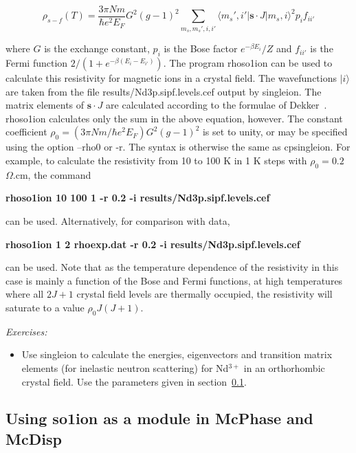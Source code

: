 \begin{enumerate}
\begin{equation} \label{eq:cfres}
\rho_{s-f}(T) = \frac{3\pi N m}{\hbar e^2 E_F} G^2(g-1)^2 \sum_{m_s,m_s',i,i'} 
      \langle m_s',i' | {\mathbf s \cdot J} | m_s, i \rangle^2 p_i f_{ii'}
\end{equation}

\noindent where $G$ is the exchange constant, $p_i$ is the Bose factor $e^{-\beta E_i}/Z$ and $f_{ii'}$ is the
Fermi function $2/(1+e^{-\beta(E_i-E_{i'})})$. The program {\prg rhoso1ion} can be used to calculate this
resistivity for magnetic ions in a crystal field. The wavefunctions $|i\rangle$ are taken from the file {\prg
results/Nd3p.sipf.levels.cef} output by {\prg singleion}. The matrix elements of ${\mathbf s \cdot J}$ are calculated according to
the formulae of Dekker~\cite{dekker}. {\prg rhoso1ion} calculates only the sum in the above equation, however.
The constant coefficient $\rho_0=(3\pi N m/\hbar e^2 E_F) G^2(g-1)^2$ is set to unity, or may be specified using
the option {\prg --rho0} or {\prg -r}. The syntax is otherwise the same as {\prg cpsingleion}. For example, to
calculate the resistivity from 10 to 100 K in 1 K steps with $\rho_0 = 0.2$~$\Omega$.cm, the command 

{\bf rhoso1ion 10 100 1 -r 0.2 -i results/Nd3p.sipf.levels.cef}

 can be used. Alternatively, for comparison with data,

 {\bf rhoso1ion 1 2 rhoexp.dat -r 0.2 -i results/Nd3p.sipf.levels.cef} 

can be used. Note that as the temperature dependence of the resistivity in this case is mainly a
function of the Bose and Fermi functions, at high temperatures where all $2J+1$ crystal field levels are
thermally occupied, the resistivity will saturate to a value $\rho_0 J(J+1)$.

\end{enumerate}

\vspace{1cm}
{\em Exercises:}
\begin{itemize}
\item Use {\prg singleion} to calculate the energies, eigenvectors and
transition matrix elements (for inelastic
neutron scattering) for Nd$^{3+}$ in an orthorhombic crystal field.
Use the parameters given in section~\ref{cf1ion}.
\end{itemize}



\subsection{Using {\prg so1ion} as a module in {\prg McPhase} and {\prg McDisp}}
\label{cf1ion}



